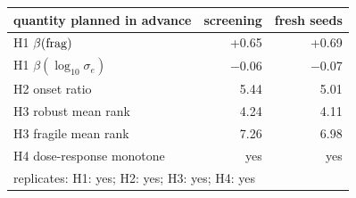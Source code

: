 \begin{tabular}{lrr}
\toprule
quantity planned in advance & screening & fresh seeds \\
\midrule
H1 $\beta(\mathrm{frag})$ & +0.65 & +0.69 \\
H1 $\beta(\log_{10}\sigma_e)$ & $-$0.06 & $-$0.07 \\
H2 onset ratio & 5.44 & 5.01 \\
H3 robust mean rank & 4.24 & 4.11 \\
H3 fragile mean rank & 7.26 & 6.98 \\
H4 dose-response monotone & yes & yes \\
\midrule
\multicolumn{3}{l}{replicates: H1: yes; H2: yes; H3: yes; H4: yes} \\
\bottomrule
\end{tabular}
